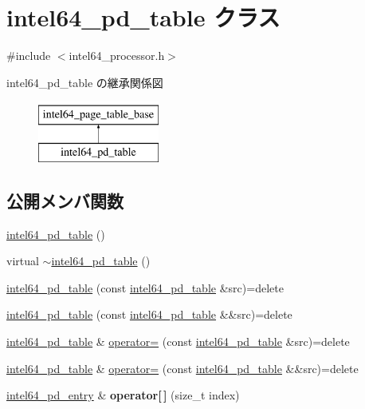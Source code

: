 \hypertarget{classintel64__pd__table}{}\section{intel64\+\_\+pd\+\_\+table クラス}
\label{classintel64__pd__table}


{\ttfamily \#include $<$intel64\+\_\+processor.\+h$>$}

intel64\+\_\+pd\+\_\+table の継承関係図\begin{figure}[H]
\begin{center}
\leavevmode
\includegraphics[height=2.000000cm]{classintel64__pd__table}
\end{center}
\end{figure}
\subsection*{公開メンバ関数}
\begin{DoxyCompactItemize}
\item 
\hyperlink{classintel64__pd__table_af7e62008481154d40e6d839df192d8e2}{intel64\+\_\+pd\+\_\+table} ()
\item 
virtual \hyperlink{classintel64__pd__table_afe82fc9da5be60f2df1b0a891e47998b}{$\sim$intel64\+\_\+pd\+\_\+table} ()
\item 
\hyperlink{classintel64__pd__table_a5d230d6f3d9805067cd03448c4cabe70}{intel64\+\_\+pd\+\_\+table} (const \hyperlink{classintel64__pd__table}{intel64\+\_\+pd\+\_\+table} \&src)=delete
\item 
\hyperlink{classintel64__pd__table_af79d6dd14067f953869cc165536745cd}{intel64\+\_\+pd\+\_\+table} (const \hyperlink{classintel64__pd__table}{intel64\+\_\+pd\+\_\+table} \&\&src)=delete
\item 
\hyperlink{classintel64__pd__table}{intel64\+\_\+pd\+\_\+table} \& \hyperlink{classintel64__pd__table_a2bb0f697a15f803d293d52469c5dae63}{operator=} (const \hyperlink{classintel64__pd__table}{intel64\+\_\+pd\+\_\+table} \&src)=delete
\item 
\hyperlink{classintel64__pd__table}{intel64\+\_\+pd\+\_\+table} \& \hyperlink{classintel64__pd__table_a710a1060b39340cc9c12dcfd1e84f117}{operator=} (const \hyperlink{classintel64__pd__table}{intel64\+\_\+pd\+\_\+table} \&\&src)=delete
\item 
\hypertarget{classintel64__pd__table_a2c0cde90090190585aa6781573ba99a2}{}\label{classintel64__pd__table_a2c0cde90090190585aa6781573ba99a2} 
\hyperlink{classintel64__pd__entry}{intel64\+\_\+pd\+\_\+entry} \& {\bfseries operator\mbox{[}$\,$\mbox{]}} (size\+\_\+t index)
\end{DoxyCompactItemize}

